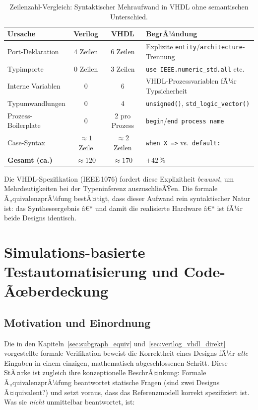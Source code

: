 ﻿\documentclass[12pt,a4paper]{report}
\begin{document}
\begin{table}[H]
	\centering
	\small
	\begin{tabular}{|l|c|c|l|}
		\hline
		\textbf{Ursache} & \textbf{Verilog} & \textbf{VHDL} & \textbf{BegrÃ¼ndung} \\
		\hline
		Port-Deklaration & 4 Zeilen & 6 Zeilen & Explizite \texttt{entity}/\texttt{architecture}-Trennung \\
		Typimporte       & 0 Zeilen & 3 Zeilen & \texttt{use IEEE.numeric\_std.all} etc.\ \\
		Interne Variablen & 0 & 6 & VHDL-Prozessvariablen fÃ¼r Typsicherheit \\
		Typumwandlungen  & 0 & 4 & \texttt{unsigned()}, \texttt{std\_logic\_vector()} \\
		Prozess-Boilerplate & 0 & 2 pro Prozess & \texttt{begin}/\texttt{end process name} \\
		Case-Syntax      & $\approx 1$ Zeile & $\approx 2$ Zeilen & \texttt{when X =>} vs.\ \texttt{default:} \\
		\hline
		\textbf{Gesamt (ca.)} & $\approx 120$ & $\approx 170$ & $+42\,\%$ \\
		\hline
	\end{tabular}
	\caption{Zeilenzahl-Vergleich: Syntaktischer Mehraufwand in VHDL ohne semantischen Unterschied.}
\end{table}

Die VHDL-Spezifikation (IEEE\,1076) fordert diese Explizitheit
\emph{bewusst}, um Mehrdeutigkeiten bei der Typeninferenz auszuschlieÃŸen.
Die formale Ã„quivalenzprÃ¼fung bestÃ¤tigt, dass dieser Aufwand rein syntaktischer
Natur ist: das Syntheseergebnis â€“ und damit die realisierte Hardware â€“ ist
fÃ¼r beide Designs identisch.

\chapter{Simulations-basierte Testautomatisierung und Code-Ãœber\-deckung}
\label{sec:pyuvm_aoi}

\section{Motivation und Einordnung}

Die in den Kapiteln~\ref{sec:subgraph_equiv} und~\ref{sec:verilog_vhdl_direkt}
vorgestellte formale Verifikation beweist die Korrektheit eines Designs fÃ¼r
\emph{alle} Eingaben in einem einzigen, mathematisch abgeschlossenen Schritt.
Diese StÃ¤rke ist zugleich ihre konzeptionelle BeschrÃ¤nkung: Formale
Ã„quivalenzprÃ¼fung beantwortet statische Fragen (sind zwei Designs Ã¤quivalent?)
und setzt voraus, dass das Referenzmodell korrekt spezifiziert ist. Was sie
\emph{nicht} unmittelbar beantwortet, ist:
\end{document}
